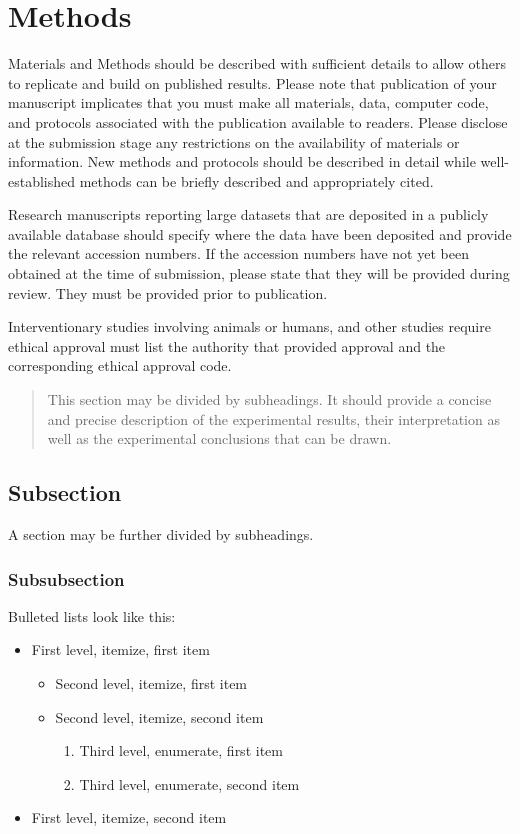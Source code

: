 \documentclass[JDR,PDF]{jdr}
\begin{document}
\section{Methods}

Materials and Methods should be described with sufficient details to allow others to replicate and build on published results. Please note that publication of your manuscript implicates that you must make all materials, data, computer code, and protocols associated with the publication available to readers. Please disclose at the submission stage any restrictions on the availability of materials or information. New methods and protocols should be described in detail while well-established methods can be briefly described and appropriately cited.

Research manuscripts reporting large datasets that are deposited in a publicly available database should specify where the data have been deposited and provide the relevant accession numbers. If the accession numbers have not yet been obtained at the time of submission, please state that they will be provided during review. They must be provided prior to publication.

Interventionary studies involving animals or humans, and other studies require ethical approval must list the authority that provided approval and the corresponding ethical approval code. 
 
\begin{quote}
This section may be divided by subheadings. It should provide a concise and precise description of the experimental results, their interpretation as well as the experimental conclusions that can be drawn.
\end{quote}

\subsection{Subsection}
A section may be further divided by subheadings.
\subsubsection{Subsubsection}

Bulleted lists look like this:
\begin{itemize}
\item First level, itemize, first item
\begin{itemize}
\item Second level, itemize, first item
\item Second level, itemize, second item
\begin{enumerate}
\item Third level, enumerate, first item
\item Third level, enumerate, second item
\end{enumerate}
\end{itemize}
\item First level, itemize, second item
\end{itemize}
\end{document}
